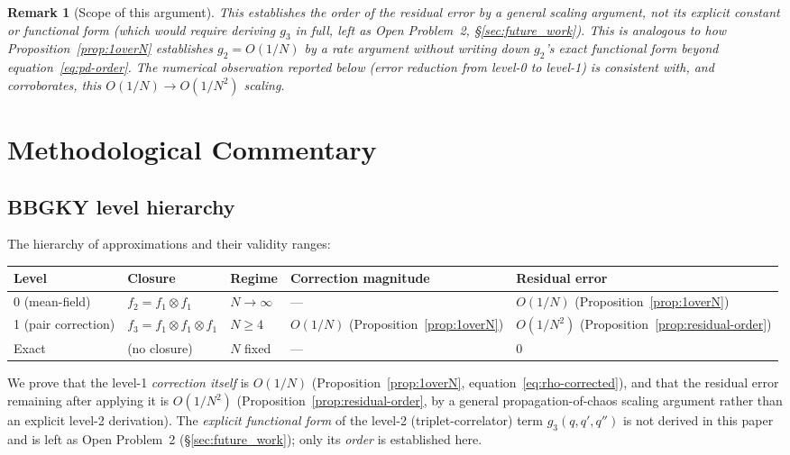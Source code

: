 \documentclass[11pt,a4paper]{article}
\newtheorem{remark}{Remark}[section]
\newcommand{\fone}{f_1}
\newcommand{\ftwo}{f_2}
\begin{document}
\begin{remark}[Scope of this argument]
This establishes the \emph{order} of the residual error by a general
scaling argument, not its explicit constant or functional form (which
would require deriving $g_3$ in full, left as Open Problem~2,
\S\ref{sec:future_work}). This is analogous to how
Proposition~\ref{prop:1overN} establishes $g_2 = O(1/N)$ by a rate
argument without writing down $g_2$'s exact functional form beyond
equation~\eqref{eq:pd-order}. The numerical observation reported below
(error reduction from level-0 to level-1) is consistent with, and
corroborates, this $O(1/N) \to O(1/N^2)$ scaling.
\end{remark}

\section{Methodological Commentary}

\subsection{BBGKY level hierarchy}

The hierarchy of approximations and their validity ranges:

\medskip
\begin{center}
\begin{tabular}{@{}lllll@{}}
\toprule
Level & Closure & Regime & Correction magnitude & Residual error \\
\midrule
0 (mean-field) & $\ftwo = \fone\!\otimes\!\fone$ & $N \to \infty$
  & --- & $O(1/N)$ (Proposition~\ref{prop:1overN}) \\
1 (pair correction) & $f_3 = \fone\!\otimes\!\fone\!\otimes\!\fone$ & $N \geq 4$
  & $O(1/N)$ (Proposition~\ref{prop:1overN}) & $O(1/N^2)$ (Proposition~\ref{prop:residual-order}) \\
Exact & (no closure) & $N$ fixed & --- & 0 \\
\bottomrule
\end{tabular}
\end{center}
\medskip

We prove that the level-1 \emph{correction itself} is $O(1/N)$
(Proposition~\ref{prop:1overN}, equation~\eqref{eq:rho-corrected}), and
that the residual error remaining after applying it is $O(1/N^2)$
(Proposition~\ref{prop:residual-order}, by a general propagation-of-chaos
scaling argument rather than an explicit level-2 derivation). The
\emph{explicit functional form} of the level-2 (triplet-correlator)
term $g_3(q,q',q'')$ is not derived in this paper and is left as Open
Problem~2 (\S\ref{sec:future_work}); only its \emph{order} is
established here.
\end{document}
